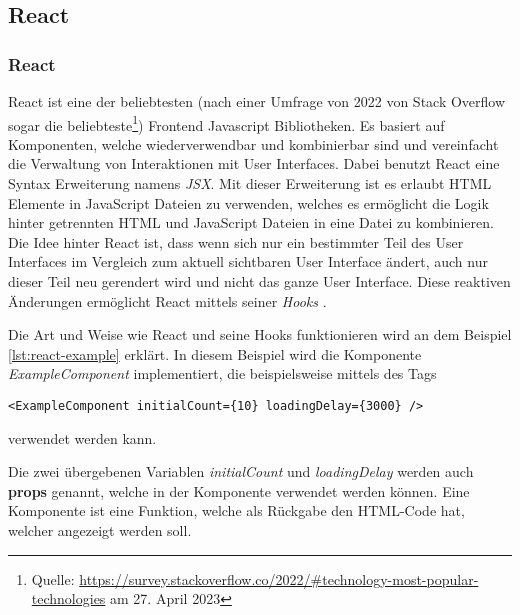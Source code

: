         \subsection{React}
        \subsubsection{React}
        \label{sec:react}
React ist eine der beliebtesten (nach einer Umfrage von 2022 von Stack Overflow sogar die beliebteste\footnote{Quelle: \url{https://survey.stackoverflow.co/2022/\#technology-most-popular-technologies} am 27. April 2023}) Frontend Javascript Bibliotheken. Es basiert auf Komponenten, welche wiederverwendbar und kombinierbar sind und vereinfacht die Verwaltung von Interaktionen mit User Interfaces. Dabei benutzt React eine Syntax Erweiterung namens \textit{JSX}. Mit dieser Erweiterung ist es erlaubt HTML Elemente in JavaScript Dateien zu verwenden, welches es ermöglicht die Logik hinter getrennten HTML und JavaScript Dateien in eine Datei zu kombinieren. Die Idee hinter React ist, dass wenn sich nur ein bestimmter Teil des User Interfaces im Vergleich zum aktuell sichtbaren User Interface ändert, auch nur dieser Teil neu gerendert wird und nicht das ganze User Interface. Diese reaktiven Änderungen ermöglicht React mittels seiner \textit{Hooks} \cite{react-key-concepts}.

Die Art und Weise wie React und seine Hooks funktionieren wird an dem Beispiel \ref{lst:react-example} erklärt.
In diesem Beispiel wird die Komponente \textit{ExampleComponent} implementiert, die beispielsweise mittels des Tags 
\begin{verbatim}
<ExampleComponent initialCount={10} loadingDelay={3000} />
\end{verbatim} verwendet werden kann. 

Die zwei übergebenen Variablen \textit{initialCount} und \textit{loadingDelay} werden auch \textbf{props} genannt, welche in der Komponente verwendet werden können. Eine Komponente ist eine Funktion, welche als Rückgabe den HTML-Code hat, welcher angezeigt werden soll.

